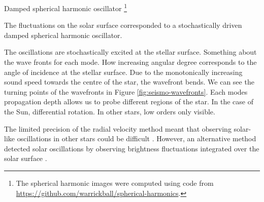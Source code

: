 

Damped spherical harmonic oscillator \footnote{The spherical harmonic images were computed using code from \url{https://github.com/warrickball/spherical-harmonics}.}

The fluctuations on the solar surface corresponded to a stochastically driven damped spherical harmonic oscillator. 


The oscillations are stochastically excited at the stellar surface. Something about the wave fronts for each mode. How increasing angular degree corresponds to the angle of incidence at the stellar surface. Due to the monotonically increasing sound speed towards the centre of the star, the wavefront bends. We can see the turning points of the wavefronts in Figure \ref{fig:seismo-wavefronts}. Each modes propagation depth allows us to probe different regions of the star. In the case of the Sun, differential rotation. In other stars, low orders only visible.

The limited precision of the radial velocity method meant that observing solar-like oscillations in other stars could be difficult \citep{Christensen-Dalsgaard1982}. However, an alternative method detected solar oscillations by observing brightness fluctuations integrated over the solar surface \citep{Woodard.Hudson1983,Woodard.Hudson1983a}.

